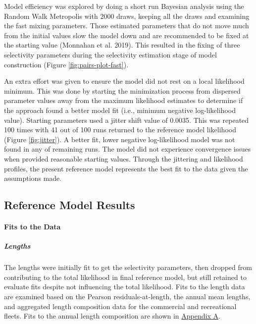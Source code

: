 \documentclass[11pt,
  letterpaper,
]{article}
\begin{document}
Model efficiency was explored by doing a short run Bayesian analysis using the Random Walk Metropolis with 2000 draws, keeping all the draws and examining the fast mixing parameters. Those estimated parameters that do not move much from the initial values slow the model down and are recommended to be fixed at the starting value (Monnahan et al. 2019). This resulted in the fixing of three selectivity parameters during the selectivity estimation stage of model construction (Figure \ref{fig:pairs-plot-fast}).

An extra effort was given to ensure the model did not rest on a local likelihood minimum. This was done by starting the minimization process from dispersed parameter values away from the maximum likelihood estimates to determine if the approach found a better model fit (i.e., minimum negative log-likelihood value). Starting parameters used a jitter shift value of 0.0035. This was repeated 100 times with 41 out of 100 runs returned to the reference model likelihood (Figure \ref{fig:jitter}). A better fit, lower negative log-likelihood model was not found in any of remaining runs. The model did not experience convergence issues when provided reasonable starting values. Through the jittering and likelihood profiles, the present reference model represents the best fit to the data given the assumptions made.

\hypertarget{reference-model-results}{%
\subsection{Reference Model Results}\label{reference-model-results}}

\hypertarget{fits-to-the-data}{%
\paragraph{Fits to the Data}\label{fits-to-the-data}}

\hypertarget{lengths}{%
\subparagraph{Lengths}\label{lengths}}

The lengths were initially fit to get the selectivity parameters, then dropped from contributing to the total likelihood in final reference model, but still retained to evaluate fits despite not influencing the total likelihood. Fits to the length data are examined based on the Pearson residuals-at-length, the annual mean lengths, and aggregated length composition data for the commercial and recreational fleets. Fits to the annual length composition are shown in \protect\hyperlink{app_a}{Appendix A}.
\end{document}

